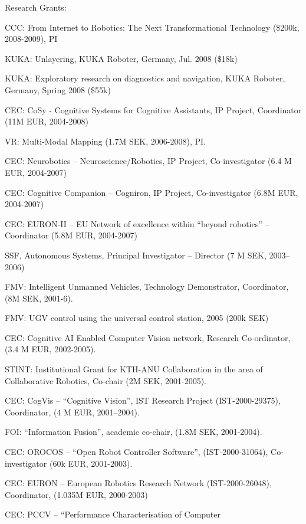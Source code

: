 \documentclass{article}
\begin{document}
\begin{cv}
\begin{cvlist}{Research Grants:}
\item CCC: From Internet to Robotics: The Next Transformational
  Technology (\$200k, 2008-2009), PI %
\item KUKA: Unlayering, KUKA Roboter, Germany, Jul. 2008 (\$18k) %
\item KUKA: Exploratory research on diagnostics and navigation, KUKA
  Roboter, Germany, Spring 2008 (\$55k)%
\item CEC: CoSy - Cognitive Systems for Cognitive Assistants, IP
  Project, Coordinator (11M EUR, 2004-2008)
\item VR: Multi-Modal Mapping (1.7M SEK, 2006-2008), PI.%
\item CEC: Neurobotics -- Neuroscience/Robotics, IP Project,
  Co-investigator (6.4 M EUR, 2004-2007)%
\item CEC: Cognitive Companion -- Cogniron, IP Project,
  Co-investigator (6.8M EUR, 2004-2007) %
\item CEC: EURON-II -- EU Network of excellence within ``beyond
  robotics''  -- Coordinator (5.8M EUR, 2004-2007) %
\item SSF, Autonomous Systems, Principal Investigator -- Director  (7
  M SEK, 2003--2006) %
\item FMV: Intelligent Unmanned Vehicles, Technology Demonstrator,
  Coordinator, (8M SEK, 2001-6). %
\item FMV: UGV control using the universal control station, 2005 (200k
  SEK) %
\item CEC: Cognitive AI Enabled Computer Vision network, Research
  Co-ordinator, (3.4 M EUR, 2002-2005). %
\item STINT: Institutional Grant for KTH-ANU Collaboration in the area
  of Collaborative Robotics, Co-chair (2M SEK, 2001-2005).%
\item CEC: CogVis -- ``Cognitive Vision'', IST Research Project
  (IST-2000-29375), Coordinator, (4 M EUR, 2001--2004).%
\item FOI: ``Information Fusion'', academic co-chair,  (1.8M SEK, 2001-2004).%
\item CEC: OROCOS -- ``Open Robot Controller Software'',
  (IST-2000-31064), Co-investigator (60k EUR, 2001-2003).%
\item CEC: EURON -- European Robotics Research Network
  (IST-2000-26048), Coordinator, (1.035M EUR, 2000-2003)%
\item CEC: PCCV -- ``Performance Characterisation of Computer

\end{cvlist}
\end{cv}
\end{document}
